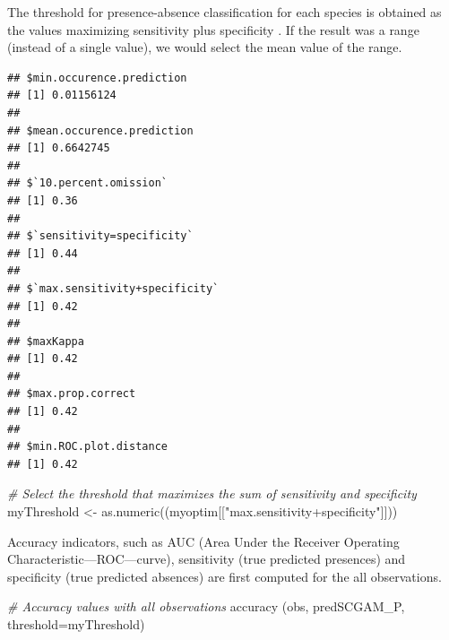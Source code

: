 \documentclass[
]{book}
\newenvironment{Shaded}{\begin{snugshade}}{\end{snugshade}}
\newcommand{\AttributeTok}[1]{\textcolor[rgb]{0.77,0.63,0.00}{#1}}
\newcommand{\CommentTok}[1]{\textcolor[rgb]{0.56,0.35,0.01}{\textit{#1}}}
\newcommand{\FunctionTok}[1]{\textcolor[rgb]{0.00,0.00,0.00}{#1}}
\newcommand{\NormalTok}[1]{#1}
\newcommand{\OtherTok}[1]{\textcolor[rgb]{0.56,0.35,0.01}{#1}}
\newcommand{\SpecialCharTok}[1]{\textcolor[rgb]{0.00,0.00,0.00}{#1}}
\newcommand{\StringTok}[1]{\textcolor[rgb]{0.31,0.60,0.02}{#1}}
\begin{document}
The threshold for presence-absence classification for each species is obtained as the values maximizing sensitivity plus specificity \citep{jimenez_etal_2007}. If the result was a range (instead of a single value), we would select the mean value of the range.

\begin{Shaded}
\end{Shaded}

\begin{verbatim}
## $min.occurence.prediction
## [1] 0.01156124
## 
## $mean.occurence.prediction
## [1] 0.6642745
## 
## $`10.percent.omission`
## [1] 0.36
## 
## $`sensitivity=specificity`
## [1] 0.44
## 
## $`max.sensitivity+specificity`
## [1] 0.42
## 
## $maxKappa
## [1] 0.42
## 
## $max.prop.correct
## [1] 0.42
## 
## $min.ROC.plot.distance
## [1] 0.42
\end{verbatim}

\begin{Shaded}
\begin{Highlighting}[]
\CommentTok{\# Select the threshold that maximizes the sum of sensitivity and specificity }
\NormalTok{myThreshold }\OtherTok{\textless{}{-}} \FunctionTok{as.numeric}\NormalTok{((myoptim[[}\StringTok{"max.sensitivity+specificity"}\NormalTok{]]))}
\end{Highlighting}
\end{Shaded}

Accuracy indicators, such as AUC (Area Under the Receiver Operating Characteristic---ROC---curve), sensitivity (true predicted presences) and specificity (true predicted absences) are first computed for the all observations.

\begin{Shaded}
\begin{Highlighting}[]
\CommentTok{\# Accuracy values with all observations}
\FunctionTok{accuracy}\NormalTok{ (obs, predSCGAM\_P, }\AttributeTok{threshold=}\NormalTok{myThreshold)}
\end{Highlighting}
\end{Shaded}
\end{document}
